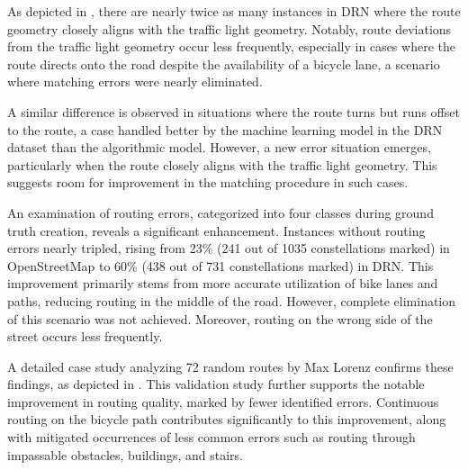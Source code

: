 As depicted in , there are nearly twice as many instances in DRN where the route geometry closely aligns with the traffic light geometry. Notably, route deviations from the traffic light geometry occur less frequently, especially in cases where the route directs onto the road despite the availability of a bicycle lane, a scenario where matching errors were nearly eliminated. 

A similar difference is observed in situations where the route turns but runs offset to the route, a case handled better by the machine learning model in the DRN dataset than the algorithmic model. However, a new error situation emerges, particularly when the route closely aligns with the traffic light geometry. This suggests room for improvement in the matching procedure in such cases.

An examination of routing errors, categorized into four classes during ground truth creation, reveals a significant enhancement. Instances without routing errors nearly tripled, rising from 23\% (241 out of 1035 constellations marked) in OpenStreetMap to 60\% (438 out of 731 constellations marked) in DRN. This improvement primarily stems from more accurate utilization of bike lanes and paths, reducing routing in the middle of the road. However, complete elimination of this scenario was not achieved. Moreover, routing on the wrong side of the street occurs less frequently.

A detailed case study analyzing 72 random routes by Max Lorenz \cite{lorenz_2022} confirms these findings, as depicted in . This validation study further supports the notable improvement in routing quality, marked by fewer identified errors. Continuous routing on the bicycle path contributes significantly to this improvement, along with mitigated occurrences of less common errors such as routing through impassable obstacles, buildings, and stairs.

